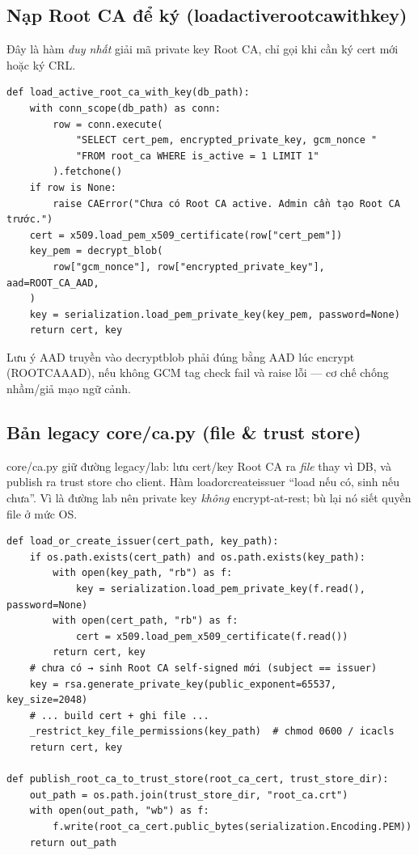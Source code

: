 \documentclass[12pt,a4paper]{article}
\newcommand{\code}[1]{{\ttfamily\small\def\_{\textunderscore\discretionary{}{}{}}#1}}
\begin{document}
\subsection{Nạp Root CA để ký (\code{load\_active\_root\_ca\_with\_key})}

Đây là hàm \emph{duy nhất} giải mã private key Root CA, chỉ gọi khi cần ký cert
mới hoặc ký CRL.

\begin{Verbatim}
def load_active_root_ca_with_key(db_path):
    with conn_scope(db_path) as conn:
        row = conn.execute(
            "SELECT cert_pem, encrypted_private_key, gcm_nonce "
            "FROM root_ca WHERE is_active = 1 LIMIT 1"
        ).fetchone()
    if row is None:
        raise CAError("Chưa có Root CA active. Admin cần tạo Root CA trước.")
    cert = x509.load_pem_x509_certificate(row["cert_pem"])
    key_pem = decrypt_blob(
        row["gcm_nonce"], row["encrypted_private_key"], aad=ROOT_CA_AAD,
    )
    key = serialization.load_pem_private_key(key_pem, password=None)
    return cert, key
\end{Verbatim}

Lưu ý AAD truyền vào \code{decrypt\_blob} phải đúng bằng AAD lúc encrypt
(\code{ROOT\_CA\_AAD}), nếu không GCM tag check fail và raise lỗi — cơ chế chống
nhầm/giả mạo ngữ cảnh.

\subsection{Bản legacy core/ca.py (file \& trust store)}

\code{core/ca.py} giữ đường legacy/lab: lưu cert/key Root CA ra \emph{file} thay
vì DB, và publish ra trust store cho client. Hàm \code{load\_or\_create\_issuer}
\enquote{load nếu có, sinh nếu chưa}. Vì là đường lab nên private key \emph{không}
encrypt-at-rest; bù lại nó siết quyền file ở mức OS.

\begin{Verbatim}
def load_or_create_issuer(cert_path, key_path):
    if os.path.exists(cert_path) and os.path.exists(key_path):
        with open(key_path, "rb") as f:
            key = serialization.load_pem_private_key(f.read(), password=None)
        with open(cert_path, "rb") as f:
            cert = x509.load_pem_x509_certificate(f.read())
        return cert, key
    # chưa có → sinh Root CA self-signed mới (subject == issuer)
    key = rsa.generate_private_key(public_exponent=65537, key_size=2048)
    # ... build cert + ghi file ...
    _restrict_key_file_permissions(key_path)  # chmod 0600 / icacls
    return cert, key

def publish_root_ca_to_trust_store(root_ca_cert, trust_store_dir):
    out_path = os.path.join(trust_store_dir, "root_ca.crt")
    with open(out_path, "wb") as f:
        f.write(root_ca_cert.public_bytes(serialization.Encoding.PEM))
    return out_path
\end{Verbatim}
\end{document}
